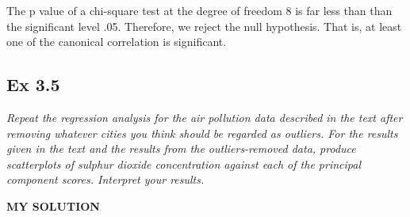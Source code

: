 \documentclass[
]{article}
\newenvironment{Shaded}{\begin{snugshade}}{\end{snugshade}}
\newcommand{\DecValTok}[1]{\textcolor[rgb]{0.00,0.00,0.81}{#1}}
\newcommand{\FloatTok}[1]{\textcolor[rgb]{0.00,0.00,0.81}{#1}}
\newcommand{\FunctionTok}[1]{\textcolor[rgb]{0.00,0.00,0.00}{#1}}
\newcommand{\NormalTok}[1]{#1}
\newcommand{\OtherTok}[1]{\textcolor[rgb]{0.56,0.35,0.01}{#1}}
\newcommand{\SpecialCharTok}[1]{\textcolor[rgb]{0.00,0.00,0.00}{#1}}
\begin{document}
\begin{Shaded}
\end{Shaded}

The p value of a chi-square test at the degree of freedom 8 is far less
than than the significant level .05. Therefore, we reject the null
hypothesis. That is, at least one of the canonical correlation is
significant.

\hypertarget{ex-3.5}{%
\subsection{Ex 3.5}\label{ex-3.5}}

\emph{Repeat the regression analysis for the air pollution data
described in the text after removing whatever cities you think should be
regarded as outliers. For the results given in the text and the results
from the outliers-removed data, produce scatterplots of sulphur dioxide
concentration against each of the principal component scores. Interpret
your results.}

\textbf{MY SOLUTION}
\end{document}
